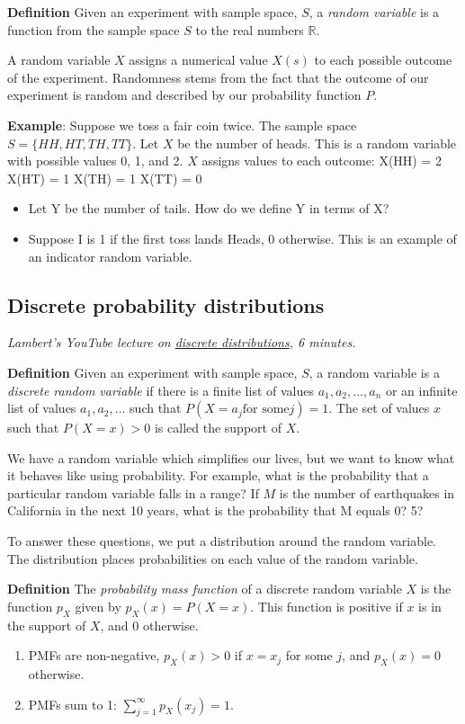 \documentclass[]{article}
\begin{document}
\textbf{Definition} Given an experiment with sample space, $S$, a \emph{random variable} is a function from the sample space $S$ to the real numbers $\mathbb{R}$.

A random variable $X$ assigns a numerical value $X(s)$ to each possible outcome of the experiment. Randomness stems from the fact that the outcome of our experiment is random and described by our probability function $P$.

\textbf{Example}: Suppose we toss a fair coin twice. The sample space $S = \{HH, HT, TH, TT\}$. Let $X$ be the number of heads. This is a random variable with possible values 0, 1, and 2. $X$ assigns values to each outcome: 
X(HH) = 2 X(HT) = 1 X(TH) = 1 X(TT) = 0

\begin{itemize}
\item
  Let Y be the number of tails. How do we define Y in terms of X?
\item
  Suppose I is 1 if the first toss lands Heads, 0 otherwise. This is an
  example of an indicator random variable.
\end{itemize}

\subsection{Discrete probability distributions}
\emph{Lambert's YouTube lecture on  \href{https://youtu.be/4Ghtj_iTSpI}{discrete distributions}, 6   minutes.}

\textbf{Definition} Given an experiment with sample space, $S$, a random variable is a \emph{discrete random variable} if there is a finite list of values $a_1, a_2, \ldots, a_n$ or an infinite list of values $a_1, a_2, \ldots$ such that $P(X = a_j \textrm{for some} j) = 1$. The set of values $x$ such that $P(X = x) > 0$ is called the support of $X$.

We have a random variable which simplifies our lives, but we want to know what it behaves like using probability. For example, what is the probability that a particular random variable falls in a range? If $M$ is the number of earthquakes in California in the next 10 years, what is the probability that M equals 0? 5?

To answer these questions, we put a distribution around the random variable. The distribution places probabilities on each value of the random variable.

\textbf{Definition} The \emph{probability mass function} of a discrete random variable $X$ is the function $p_X$ given by $p_X(x) = P(X = x)$. This function is positive if $x$ is in the support of $X$,  and $0$ otherwise. 
\begin{enumerate}
\item 
PMFs are non-negative, $p_X(x) > 0$ if  $x = x_j$ for some $j$, and $p_X(x) = 0$ otherwise. 
\item
PMFs sum to 1: $\sum_{j=1}^{\infty} p_X(x_j) = 1$.
\end{enumerate}
\end{document}
